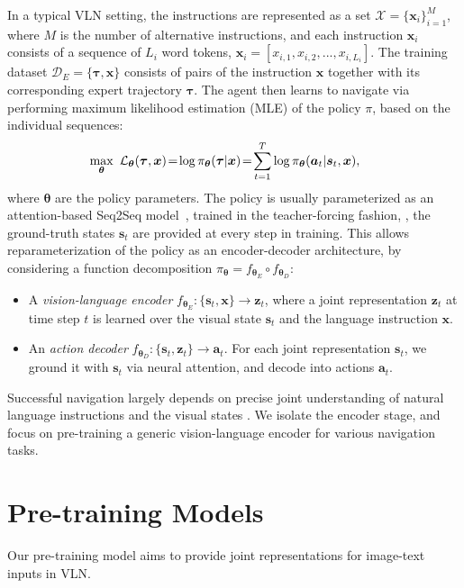 \documentclass[10pt,twocolumn,letterpaper]{article}
\newcommand{\av}{{\boldsymbol{a}}}
\newcommand{\sv}{{\boldsymbol{s}}}
\newcommand{\xv}{\boldsymbol{x}}
\newcommand{\zv}{\boldsymbol{z}}
\newcommand{\thetav}{\boldsymbol{\theta}}
\newcommand{\tauv}[0]{{\boldsymbol{\tau}}}
\newcommand{\Xcal}{\mathcal{X}}
\newcommand{\Lcal}{\mathcal{L}}
\newcommand{\Dcal}{\mathcal{D}}
\begin{document}
In a typical VLN setting, the instructions are represented as a set $\Xcal = \{\xv_i\}_{i=1}^M$, where $M$ is the number of alternative instructions, and each instruction $\xv_i$ consists of a sequence of $L_i$ word tokens, $\xv_i = [x_{i,1}, x_{i,2}, ..., x_{i,L_i}]$. 
The training dataset $\Dcal_{E} = \{\tauv, \xv \}$ consists of pairs of the instruction $\xv$ together with its corresponding expert trajectory $\tauv$.
The agent then learns to navigate via performing maximum likelihood estimation (MLE) of the policy $\pi$, based on the individual sequences: 
\begin{align} 
\hspace{-5mm}
\vspace{-5mm}
 \max_{\thetav}~ \Lcal_{\thetav}(\tauv, \xv) 
\! = \! \log \pi_{\thetav}(\tauv|\xv)
\! = \!\sum_{t=1}^{T}  \log \pi_{\thetav}(\av_t | \sv_t, \xv), 
\label{eq_iid}
\end{align}
where $\thetav$ are the policy parameters. The policy is usually parameterized as an attention-based Seq2Seq model~\cite{anderson2018vision,fried2018speaker}, trained in the teacher-forcing fashion, \ie, the ground-truth states $\sv_t$ are provided at every step in training. 
This allows reparameterization of the policy as an encoder-decoder architecture, by considering a function decomposition $\pi_{\thetav} = f_{\thetav_{E}} \circ  f_{\thetav_{D}}$:
\begin{itemize}\item  A {\em vision-language encoder} $f_{\thetav_{E}}: \{\sv_t, \xv\} \rightarrow  \zv_t$, where a joint representation $\zv_t$ at time step $t$ is learned over the visual state $\sv_t$ and the language instruction $\xv$.
    \vspace{-4mm}
    \item An {\em action decoder} $f_{\thetav_{D}}: \{\sv_t, \zv_t\} \rightarrow  \av_t$. For each joint representation $\sv_t$, we ground it with $\sv_t$ via neural attention, and decode into actions $\av_t$.
    \vspace{-2mm}
\end{itemize}

Successful navigation largely depends on precise joint understanding of natural language instructions and the visual states \cite{Thomason:19}. We isolate the encoder stage, and focus on pre-training a generic vision-language encoder for various navigation tasks. 






\section{Pre-training Models}
Our pre-training model aims to provide joint representations for image-text inputs in VLN.
\end{document}
